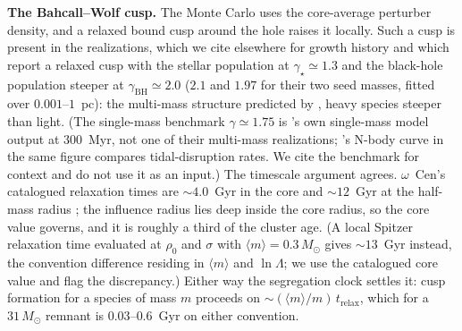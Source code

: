 \documentclass[11pt]{article}
\newcommand{\msun}{\ensuremath{M_\odot}}
\newcommand{\ocen}{\ensuremath{\omega}~Cen}
\begin{document}
\textbf{The Bahcall--Wolf cusp.} The Monte Carlo uses the core-average perturber density, and a relaxed bound cusp around the hole raises it locally. Such a cusp is present in the \citet{GonzalezPrieto2025} realizations, which we cite elsewhere for growth history and which report a relaxed cusp with the stellar population at $\gamma_{\star} \simeq 1.3$ and the black-hole population steeper at $\gamma_{\mathrm{BH}} \simeq 2.0$ ($2.1$ and $1.97$ for their two seed masses, fitted over $0.001$--$1$~pc): the multi-mass structure predicted by \citet{BahcallWolf1976,BahcallWolf1977}, heavy species steeper than light. (The single-mass benchmark $\gamma \simeq 1.75$ is \citet{GonzalezPrieto2025}'s own single-mass model output at $300$~Myr, not one of their multi-mass realizations; \citet{Baumgardt2004}'s N-body curve in the same figure compares tidal-disruption rates. We cite the benchmark for context and do not use it as an input.) The timescale argument agrees. \ocen's catalogued relaxation times are $\sim 4.0$~Gyr in the core and $\sim 12$~Gyr at the half-mass radius \citep{Harris1996}; the influence radius lies deep inside the core radius, so the core value governs, and it is roughly a third of the cluster age. (A local Spitzer relaxation time evaluated at $\rho_{0}$ and $\sigma$ with $\langle m \rangle = 0.3\,\msun$ gives $\sim 13$~Gyr instead, the convention difference residing in $\langle m \rangle$ and $\ln\Lambda$; we use the catalogued core value and flag the discrepancy.) Either way the segregation clock settles it: cusp formation for a species of mass $m$ proceeds on $\sim (\langle m\rangle/m)\,t_{\mathrm{relax}}$, which for a $31\,\msun$ remnant is $0.03$--$0.6$~Gyr on either convention.
\end{document}
